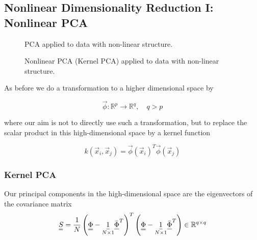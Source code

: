 \subsection{Nonlinear Dimensionality Reduction I: Nonlinear PCA}

\begin{figure}[!htb]
    \centering
    
    \caption{PCA applied to data with non-linear structure.}
    \label{fig:pca_examples}
\end{figure}


\begin{figure}[!htb]
    \centering
    
    \caption{Nonlinear PCA (Kernel PCA) applied to data with non-linear structure.}
    \label{fig:nonlinear_pca}
\end{figure}

As before we do a transformation to a higher dimensional space by

\begin{equation}
    \vec{\phi} : \mathbb{R}^p \rightarrow \mathbb{R}^q, \quad q > p
\end{equation}

where our aim is not to directly use such a transformation, but to 
replace the scalar product in this high-dimensional space by a kernel function

\begin{equation}
    k(\vec{x}_i, \vec{x}_j) = \vec{\phi}(\vec{x}_i)^T \vec{\phi}(\vec{x}_j)
\end{equation}

\subsubsection{Kernel PCA}
Our principal components in the high-dimensional space are the eigenvectors of the covariance
matrix
\begin{equation}
    \mat{S} = \frac{1}{N} \left( \mat{\Phi} - \underset{N\times 1}{\vec{1}} \vec{\bar{\Phi}}^T \right)^T \left( \mat{\Phi} - \underset{N\times 1}{\vec{1}} \vec{\bar{\Phi}}^T \right) \in \mathbb{R}^{q \times q}
\end{equation}

